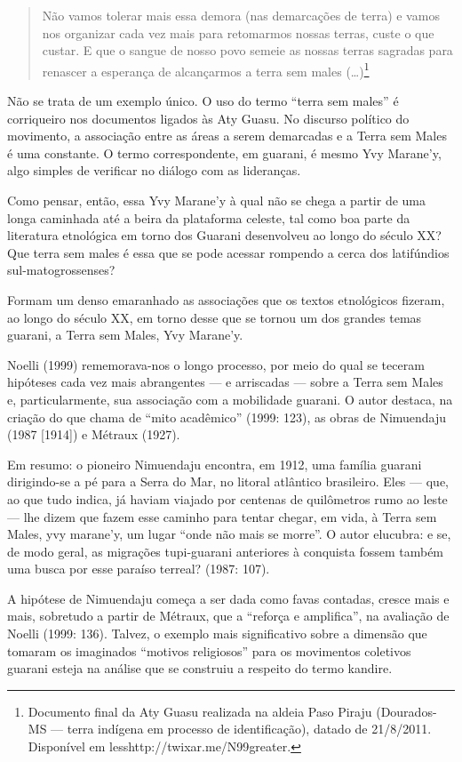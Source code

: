 \begin{quotation}
Não vamos tolerar mais essa demora (nas demarcações de terra) e vamos
nos organizar cada vez mais para retomarmos nossas terras, custe o que
custar. E que o sangue de nosso povo semeie as nossas terras sagradas
para renascer a esperança de alcançarmos a terra sem males
(\ldots{})\footnote{Documento final da Aty Guasu realizada na aldeia Paso
Piraju (Dourados-MS — terra indígena em processo de identificação),
datado de 21/8/2011. Disponível em
{less}http://twixar.me/N99{greater}.}
\end{quotation}

Não se trata de um exemplo único. O uso do termo ``terra sem males'' é
corriqueiro nos documentos ligados às Aty Guasu. No discurso político
do movimento, a associação entre as áreas a serem demarcadas e a Terra
sem Males é uma constante. O termo correspondente, em guarani, é mesmo
Yvy Marane’y, algo simples de verificar no diálogo com as lideranças.

Como pensar, então, essa Yvy Marane’y à qual não se chega a partir de
uma longa caminhada até a beira da plataforma celeste, tal como boa
parte da literatura etnológica em torno dos Guarani desenvolveu ao
longo do século XX? Que terra sem males é essa que se pode acessar
rompendo a cerca dos latifúndios sul-matogrossenses?

Formam um denso emaranhado as associações que os textos etnológicos
fizeram, ao longo do século XX, em torno desse que se tornou um dos
grandes temas guarani, a Terra sem Males, Yvy Marane’y.

Noelli (1999) rememorava-nos o longo processo, por meio do qual se
teceram hipóteses cada vez mais abrangentes — e arriscadas — sobre a
Terra sem Males e, particularmente, sua associação com a mobilidade
guarani. O autor destaca, na criação do que chama de ``mito acadêmico''
(1999: 123), as obras de Nimuendaju (1987 [1914]) e Métraux (1927).

Em resumo: o pioneiro Nimuendaju encontra, em 1912, uma família guarani
dirigindo-se a pé para a Serra do Mar, no litoral atlântico brasileiro.
Eles — que, ao que tudo indica, já haviam viajado por centenas de
quilômetros rumo ao leste — lhe dizem que fazem esse caminho para
tentar chegar, em vida, à Terra sem Males, yvy marane’y, um lugar ``onde
não mais se morre''. O autor elucubra: e se, de modo geral, as migrações
tupi-guarani anteriores à conquista fossem também uma busca por esse
paraíso terreal? (1987: 107).

A hipótese de Nimuendaju começa a ser dada como favas contadas, cresce
mais e mais, sobretudo a partir de Métraux, que a ``reforça e
amplifica'', na avaliação de Noelli  (1999: 136). Talvez, o exemplo mais
significativo sobre a dimensão que tomaram os imaginados ``motivos
religiosos'' para os movimentos coletivos guarani esteja na análise que
se construiu a respeito do termo kandire.

